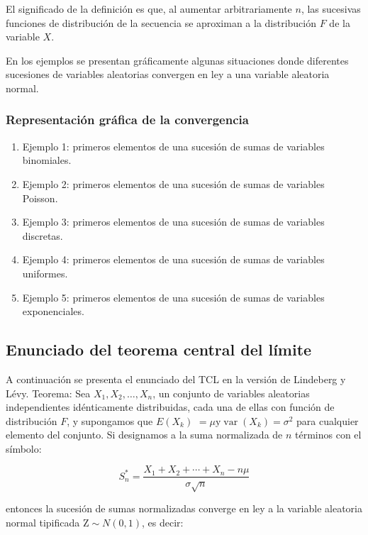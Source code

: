 \documentclass[
  a4paper,
  DIV=11,
  numbers=noendperiod]{scrreprt}
\providecommand{\tightlist}{%
  \setlength{\itemsep}{0pt}\setlength{\parskip}{0pt}}\usepackage{longtable,booktabs,array}
\begin{document}
El significado de la definición es que, al aumentar arbitrariamente
\(n\), las sucesivas funciones de distribución de la secuencia se
aproximan a la distribución \(F\) de la variable \(X\).

En los ejemplos se presentan gráficamente algunas situaciones donde
diferentes sucesiones de variables aleatorias convergen en ley a una
variable aleatoria normal.

\subsubsection{Representación gráfica de la
convergencia}\label{representaciuxf3n-gruxe1fica-de-la-convergencia}

\begin{enumerate}
\def\labelenumi{\arabic{enumi}.}
\tightlist
\item
  Ejemplo 1: primeros elementos de una sucesión de sumas de variables
  binomiales.
\item
  Ejemplo 2: primeros elementos de una sucesión de sumas de variables
  Poisson.
\item
  Ejemplo 3: primeros elementos de una sucesión de sumas de variables
  discretas.
\item
  Ejemplo 4: primeros elementos de una sucesión de sumas de variables
  uniformes.
\item
  Ejemplo 5: primeros elementos de una sucesión de sumas de variables
  exponenciales.
\end{enumerate}

\subsection{Enunciado del teorema central del
límite}\label{enunciado-del-teorema-central-del-luxedmite}

A continuación se presenta el enunciado del TCL en la versión de
Lindeberg y Lévy. Teorema: Sea \(X_{1}, X_{2}, \ldots, X_{n}\), un
conjunto de variables aleatorias independientes idénticamente
distribuidas, cada una de ellas con función de distribución \(F\), y
supongamos que \(E\left(X_{k}\right)\)
\(=\mu \mathrm{y} \operatorname{var}\left(X_{k}\right)=\sigma^{2}\) para
cualquier elemento del conjunto. Si designamos a la suma normalizada de
\(n\) términos con el símbolo:

\[
S_{n}^{*}=\frac{X_{1}+X_{2}+\cdots+X_{n}-n \mu}{\sigma \sqrt{n}}
\]

entonces la sucesión de sumas normalizadas converge en ley a la variable
aleatoria normal tipificada \(\mathrm{Z} \sim N(0,1)\), es decir:
\end{document}
